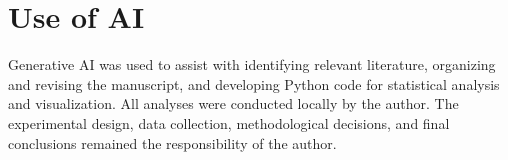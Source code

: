 \documentclass[manuscript,review]{acmart}
\begin{document}
\section{Use of AI}
Generative AI was used to assist with identifying relevant literature, organizing and revising the manuscript, and developing Python code for statistical analysis and visualization. All analyses were conducted locally by the author. The experimental design, data collection, methodological decisions, and final conclusions remained the responsibility of the author.





\end{document}

